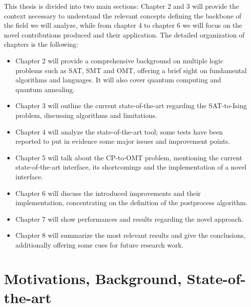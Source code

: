 This thesis is divided into two main sections: Chapter 2 and 3 will provide the context necessary to understand the relevant concepts defining the backbone of the field we will analyze, while from chapter 4 to chapter 6 we will focus on the novel contributions produced and their application. The detailed organization of chapters is the following:

\begin{itemize}
    \item Chapter 2 will provide a comprehensive background on multiple logic problems such as SAT, SMT and OMT, offering a brief sight on fundamental algorithms and languages. It will also cover quantum computing and quantum annealing.
    \item Chapter 3 will outline the current state-of-the-art regarding the SAT-to-Ising problem, discussing algorithms and limitations.
    \item Chapter 4 will analyze the state-of-the-art tool; some tests have been reported to put in evidence some major issues and improvement points.
    \item Chapter 5 will talk about the CP-to-OMT problem, mentioning the current state-of-the-art interface, its shortcomings and the implementation of a novel interface.
    \item Chapter 6 will discuss the introduced improvements and their implementation, concentrating on the definition of the postprocess algorithm.
    \item Chapter 7 will show performances and results regarding the novel approach. 
    \item Chapter 8 will summarize the most relevant results and give the conclusions, additionally offering some cues for future research work.
\end{itemize}

\newpage

\part{Motivations, Background, State-of-the-art}